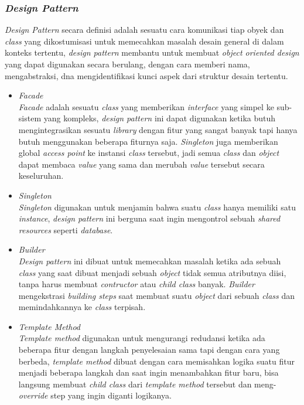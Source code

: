 \documentclass[a4paper]{article}
\newcommand{\subsubbab}[1]{%
    \subsubsection{#1}%
}
\begin{document}
\subsubbab{\textit{Design Pattern}}
\textit{Design Pattern} secara definisi adalah sesuatu cara komunikasi tiap obyek dan \textit{class} yang dikostumisasi untuk memecahkan masalah desain general di dalam konteks tertentu, \textit{design pattern} membantu untuk membuat \textit{object oriented design} yang dapat digunakan secara berulang, dengan cara memberi nama, mengabstraksi, dna mengidentifikasi kunci aspek dari struktur desain tertentu\autocite{design-pattern-2588942}.
\begin{itemize}
    \item \textit{Facade}\\
          \textit{Facade} adalah sesuatu \textit{class} yang memberikan \textit{interface} yang simpel ke sub-sistem yang kompleks, \textit{design pattern} ini dapat digunakan ketika butuh mengintegrasikan sesuatu \textit{library} dengan fitur yang sangat banyak tapi hanya butuh menggunakan beberapa fiturnya saja\autocite{refactoring-guru}. \textit{Singleton} juga memberikan global \textit{access point} ke instansi \textit{class} tersebut, jadi semua \textit{class} dan \textit{object} dapat membaca \textit{value} yang sama dan merubah \textit{value} tersebut secara keseluruhan\autocite{refactoring-guru}.
    \item \textit{Singleton}\\
          \textit{Singleton} digunakan untuk menjamin bahwa suatu \textit{class} hanya memiliki satu \textit{instance}, \textit{design pattern} ini berguna saat ingin mengontrol sebuah \textit{shared resources} seperti \textit{database}\autocite{refactoring-guru}.
    \item \textit{Builder}\\
          \textit{Design pattern} ini dibuat untuk memecahkan masalah ketika ada sebuah \textit{class} yang saat dibuat menjadi sebuah \textit{object} tidak semua atributnya diisi, tanpa harus membuat \textit{contructor} atau \textit{child class} banyak. \textit{Builder} mengekstrasi \textit{building steps} saat membuat suatu \textit{object} dari sebuah \textit{class} dan memindahkannya ke \textit{class} terpisah\autocite{refactoring-guru}.
    \item \textit{Template Method}\\
          \textit{Template method} digunakan untuk mengurangi redudansi ketika ada beberapa fitur dengan langkah penyelesaian sama tapi dengan cara yang berbeda, \textit{template method} dibuat dengan cara memisahkan logika suatu fitur menjadi beberapa langkah dan saat ingin menambahkan fitur baru, bisa langsung membuat \textit{child class} dari \textit{template method} tersebut dan meng-\textit{override} step yang ingin diganti logikanya\autocite{refactoring-guru}.
\end{itemize}
\end{document}
